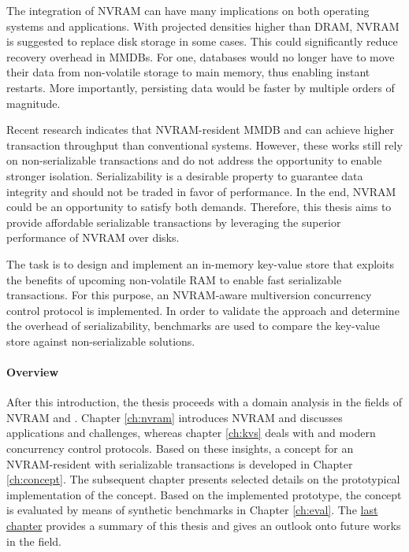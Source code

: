 The integration of \ac{NVRAM} can have many implications on both operating
systems and applications. With projected densities higher than \ac{DRAM},
\ac{NVRAM} is suggested to replace disk storage in some cases. This could
significantly reduce recovery overhead in \acp{MMDB}. For one, databases would
no longer have to move their data from non-volatile storage to main memory, thus
enabling instant restarts. More importantly, persisting data would be faster by
multiple orders of magnitude.


Recent research indicates that NVRAM-resident \ac{MMDB} and \kvsp can achieve
higher transaction throughput than conventional systems. However, these works
still rely on non-serializable transactions and do not address the opportunity
to enable stronger isolation. Serializability is a desirable property to
guarantee data integrity and should not be traded in favor of performance. In
the end, \ac{NVRAM} could be an opportunity to satisfy both demands. Therefore,
this thesis aims to provide affordable serializable transactions by leveraging
the superior performance of \ac{NVRAM} over disks.


The task is to design and implement an in-memory key-value store that exploits
the benefits of upcoming non-volatile \ac{RAM} to enable fast serializable
transactions. For this purpose, an \ac{NVRAM}-aware multiversion concurrency
control protocol is implemented. In order to validate the approach and determine
the overhead of serializability, benchmarks are used to compare the key-value
store against non-serializable solutions.


\paragraph{Overview}

After this introduction, the thesis proceeds with a domain analysis in the
fields of \ac{NVRAM} and \kvsp. Chapter \ref{ch:nvram} introduces \ac{NVRAM} and
discusses applications and challenges, whereas chapter \ref{ch:kvs} deals with
\kvsp and modern concurrency control protocols. Based on these insights, a
concept for an NVRAM-resident \kvs with serializable transactions is developed
in Chapter \ref{ch:concept}. The subsequent chapter presents selected details on
the prototypical implementation of the concept. Based on the implemented
prototype, the concept is evaluated by means of synthetic benchmarks in Chapter
\ref{ch:eval}. The \hyperref[ch:summary]{last chapter} provides a summary of
this thesis and gives an outlook onto future works in the field.

